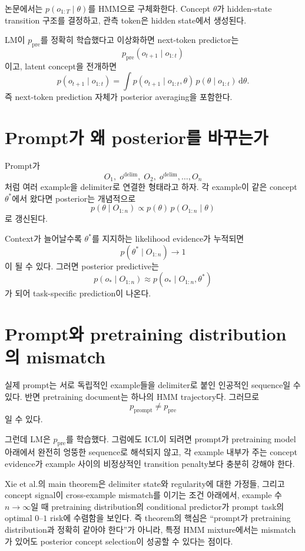 \documentclass[11pt,a4paper,oneside,openany]{memoir}
\newcommand{\dd}{\,\mathrm{d}}
\theoremstyle{definition}
\begin{document}
논문에서는 $p(o_{1:T}\mid\theta)$를 HMM으로 구체화한다.
Concept $\theta$가 hidden-state transition 구조를 결정하고, 관측 token은 hidden state에서 생성된다.

LM이 $p_{\mathrm{pre}}$를 정확히 학습했다고 이상화하면 next-token predictor는
\[
p_{\mathrm{pre}}(o_{t+1}\mid o_{1:t})
\]
이고, latent concept을 전개하면
\[
p(o_{t+1}\mid o_{1:t})
=
\int
p(o_{t+1}\mid o_{1:t},\theta)
\,p(\theta\mid o_{1:t})\dd\theta.
\]
즉 next-token prediction 자체가 posterior averaging을 포함한다.

\section{Prompt가 왜 posterior를 바꾸는가}

Prompt가
\[
O_1,\;o^{\mathrm{delim}},\;O_2,\;o^{\mathrm{delim}},\ldots,O_n
\]
처럼 여러 example을 delimiter로 연결한 형태라고 하자.
각 example이 같은 concept $\theta^*$에서 왔다면 posterior는 개념적으로
\[
p(\theta\mid O_{1:n})
\propto
p(\theta)\,p(O_{1:n}\mid\theta)
\]
로 갱신된다.

Context가 늘어날수록 $\theta^*$를 지지하는 likelihood evidence가 누적되면
\[
p(\theta^*\mid O_{1:n})\to1
\]
이 될 수 있다. 그러면 posterior predictive는
\[
p(o_*\mid O_{1:n})
\approx p(o_*\mid O_{1:n},\theta^*)
\]
가 되어 task-specific prediction이 나온다.

\section{Prompt와 pretraining distribution의 mismatch}

실제 prompt는 서로 독립적인 example들을 delimiter로 붙인 인공적인 sequence일 수 있다.
반면 pretraining document는 하나의 HMM trajectory다.
그러므로
\[
p_{\mathrm{prompt}}\neq p_{\mathrm{pre}}
\]
일 수 있다.

그런데 LM은 $p_{\mathrm{pre}}$를 학습했다. 그럼에도 ICL이 되려면 prompt가 pretraining model 아래에서 완전히 엉뚱한 sequence로 해석되지 않고,
각 example 내부가 주는 concept evidence가 example 사이의 비정상적인 transition penalty보다 충분히 강해야 한다.

\begin{paperbox}
Xie et al.의 main theorem은 delimiter state와 regularity에 대한 가정들, 그리고 concept signal이 cross-example mismatch를 이기는 조건 아래에서, example 수 $n\to\infty$일 때 pretraining distribution의 conditional predictor가 prompt task의 optimal $0$--$1$ risk에 수렴함을 보인다. 즉 theorem의 핵심은 ``prompt가 pretraining distribution과 정확히 같아야 한다''가 아니라, 특정 HMM mixture에서는 mismatch가 있어도 posterior concept selection이 성공할 수 있다는 점이다.
\end{paperbox}
\end{document}
